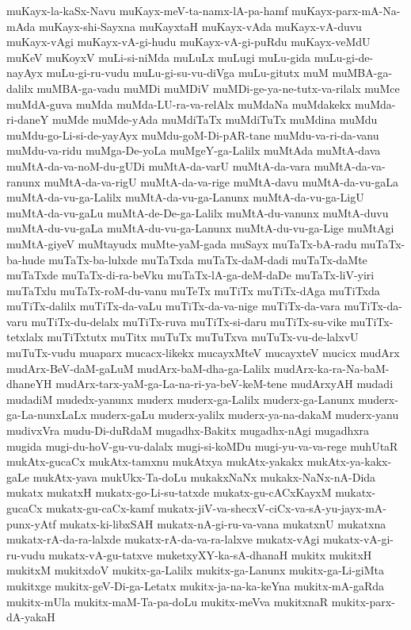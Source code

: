 {muKayx-la-kaSx-Navu
muKayx-meV-ta-namx-lA-pa-hamf
muKayx-parx-mA-Na-mAda
muKayx-shi-Sayxna
muKayxtaH
muKayx-vAda
muKayx-vA-duvu
muKayx-vAgi
muKayx-vA-gi-hudu
muKayx-vA-gi-puRdu
muKayx-veMdU
muKeV
muKoyxV
muLi-si-niMda
muLuLx
muLugi
muLu-gida
muLu-gi-de-nayAyx
muLu-gi-ru-vudu
muLu-gi-su-vu-diVga
muLu-gitutx
muM
muMBA-ga-dalilx
muMBA-ga-vadu
muMDi
muMDiV
muMDi-ge-ya-ne-tutx-va-rilalx
muMce
muMdA-guva
muMda
muMda-LU-ra-va-relAlx
muMdaNa
muMdakekx
muMda-ri-daneY
muMde
muMde-yAda
muMdiTaTx
muMdiTuTx
muMdina
muMdu
muMdu-go-Li-si-de-yayAyx
muMdu-goM-Di-pAR-tane
muMdu-va-ri-da-vanu
muMdu-va-ridu
muMga-De-yoLa
muMgeY-ga-Lalilx
muMtAda
muMtA-dava
muMtA-da-va-noM-du-gUDi
muMtA-da-varU
muMtA-da-vara
muMtA-da-va-ranunx
muMtA-da-va-rigU
muMtA-da-va-rige
muMtA-davu
muMtA-da-vu-gaLa
muMtA-da-vu-ga-Lalilx
muMtA-da-vu-ga-Lanunx
muMtA-da-vu-ga-LigU
muMtA-da-vu-gaLu
muMtA-de-De-ga-Lalilx
muMtA-du-vanunx
muMtA-duvu
muMtA-du-vu-gaLa
muMtA-du-vu-ga-Lanunx
muMtA-du-vu-ga-Lige
muMtAgi
muMtA-giyeV
muMtayudx
muMte-yaM-gada
muSayx
muTaTx-bA-radu
muTaTx-ba-hude
muTaTx-ba-lulxde
muTaTxda
muTaTx-daM-dadi
muTaTx-daMte
muTaTxde
muTaTx-di-ra-beVku
muTaTx-lA-ga-deM-daDe
muTaTx-liV-yiri
muTaTxlu
muTaTx-roM-du-vanu
muTeTx
muTiTx
muTiTx-dAga
muTiTxda
muTiTx-dalilx
muTiTx-da-vaLu
muTiTx-da-va-nige
muTiTx-da-vara
muTiTx-da-varu
muTiTx-du-delalx
muTiTx-ruva
muTiTx-si-daru
muTiTx-su-vike
muTiTx-tetxlalx
muTiTxtutx
muTitx
muTuTx
muTuTxva
muTuTx-vu-de-lalxvU
muTuTx-vudu
muaparx
mucacx-likekx
mucayxMteV
mucayxteV
mucicx
mudArx
mudArx-BeV-daM-gaLuM
mudArx-baM-dha-ga-Lalilx
mudArx-ka-ra-Na-baM-dhaneYH
mudArx-tarx-yaM-ga-La-na-ri-ya-beV-keM-tene
mudArxyAH
mudadi
mudadiM
mudedx-yanunx
muderx
muderx-ga-Lalilx
muderx-ga-Lanunx
muderx-ga-La-nunxLaLx
muderx-gaLu
muderx-yalilx
muderx-ya-na-dakaM
muderx-yanu
mudivxVra
mudu-Di-duRdaM
mugadhx-Bakitx
mugadhx-nAgi
mugadhxra
mugida
mugi-du-hoV-gu-vu-dalalx
mugi-si-koMDu
mugi-yu-va-va-rege
muhUtaR
mukAtx-gucaCx
mukAtx-tamxnu
mukAtxya
mukAtx-yakakx
mukAtx-ya-kakx-gaLe
mukAtx-yava
mukUkx-Ta-doLu
mukakxNaNx
mukakx-NaNx-nA-Dida
mukatx
mukatxH
mukatx-go-Li-su-tatxde
mukatx-gu-cACxKayxM
mukatx-gucaCx
mukatx-gu-caCx-kamf
mukatx-jiV-va-shecxV-ciCx-va-sA-yu-jayx-mA-punx-yAtf
mukatx-ki-libxSAH
mukatx-nA-gi-ru-va-vana
mukatxnU
mukatxna
mukatx-rA-da-ra-lalxde
mukatx-rA-da-va-ra-lalxve
mukatx-vAgi
mukatx-vA-gi-ru-vudu
mukatx-vA-gu-tatxve
muketxyXY-ka-sA-dhanaH
mukitx
mukitxH
mukitxM
mukitxdoV
mukitx-ga-Lalilx
mukitx-ga-Lanunx
mukitx-ga-Li-giMta
mukitxge
mukitx-geV-Di-ga-Letatx
mukitx-ja-na-ka-keYna
mukitx-mA-gaRda
mukitx-mUla
mukitx-maM-Ta-pa-doLu
mukitx-meVva
mukitxnaR
mukitx-parx-dA-yakaH
}
